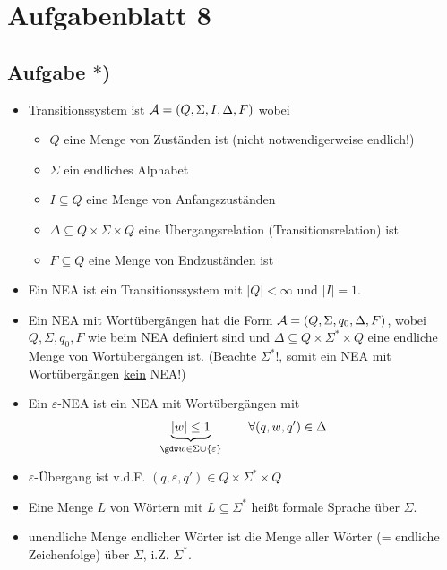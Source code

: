 
\section{Aufgabenblatt 8}

\subsection*{Aufgabe $\ast$)}
\begin{itemize}
	\item Transitionssystem ist $\mathcal{A}=(Q,\Sigma,I,\Delta,F)$ wobei
	\begin{itemize}
		\item $Q$ eine Menge von Zuständen ist (nicht notwendigerweise endlich!)
		\item $\Sigma$ ein endliches Alphabet
		\item $I\subseteq Q$ eine Menge von Anfangszuständen
		\item $\Delta\subseteq Q\times\Sigma\times Q$ eine Übergangsrelation (Transitionsrelation) ist
		\item $F\subseteq Q$ eine Menge von Endzuständen ist
	\end{itemize}
	\item Ein NEA ist ein Transitionssystem mit $|Q|<\infty$ und $|I|=1$.
	\item Ein NEA mit Wortübergängen hat die Form $\mathcal{A}=(Q,\Sigma,q_0,\Delta,F)$, wobei $Q,\Sigma,q_0,F$ wie beim NEA definiert sind und $\Delta\subseteq Q\times \Sigma^\ast\times Q$ eine endliche Menge von Wortübergängen ist. 
	(Beachte $\Sigma^\ast$!, somit ein NEA mit Wortübergängen \underline{kein} NEA!)
	\item Ein $\varepsilon$-NEA ist ein NEA mit Wortübergängen mit
	\begin{align*}
		\underbrace{|w|\leq1}_{\gdw w\in\Sigma\cup\lbrace\varepsilon\rbrace}\qquad\forall(q,w,q')\in\Delta
	\end{align*}
	\item $\varepsilon$-Übergang ist v.d.F. $(q,\varepsilon,q')\in Q\times\Sigma^\ast\times Q$
	\item Eine Menge $L$ von Wörtern mit $L\subseteq\Sigma^\ast$ heißt formale Sprache über $\Sigma$.
	\item unendliche Menge endlicher Wörter ist die Menge aller Wörter (= endliche Zeichenfolge) über $\Sigma$, i.Z. $\Sigma^\ast$.
\end{itemize}

